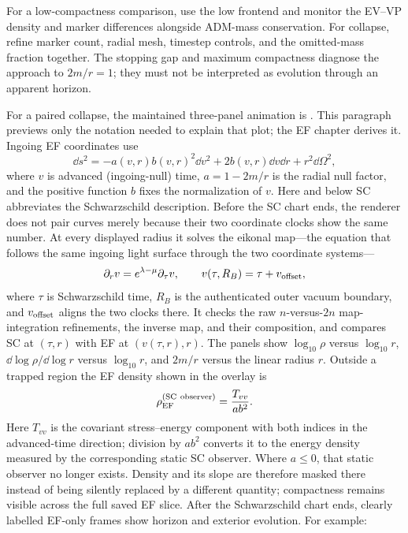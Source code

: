 For a low-compactness comparison, use the low frontend and monitor the EV--VP
density and marker differences alongside ADM-mass conservation.  For collapse,
refine marker count, radial mesh, timestep controls, and the omitted-mass
fraction together.  The stopping gap and maximum compactness diagnose the
approach to \(2m/r=1\); they must not be interpreted as evolution through an
apparent horizon.

For a paired collapse, the maintained three-panel animation is
.  This
paragraph previews only the notation needed to explain that plot; the EF
chapter derives it.  Ingoing EF coordinates use
\[
 \dd s^2=-a(v,r)b(v,r)^2\dd v^2+2b(v,r)\dd v\dd r
          +r^2\dd\Omega^2,
\]
where \(v\) is advanced (ingoing-null) time, \(a=1-2m/r\) is the radial null
factor, and the positive function \(b\) fixes the normalization of \(v\).
Here and below SC abbreviates the Schwarzschild description.
Before the SC chart ends, the renderer does not pair curves merely because
their two coordinate clocks show the same number.  At every displayed radius
it solves the eikonal map---the equation that follows the same ingoing light
surface through the two coordinate systems---
\[
 \partial_r v=e^{\lambda-\mu}\partial_\tau v,
 \qquad v(\tau,R_B)=\tau+v_{\rm offset},
\]
where \(\tau\) is Schwarzschild time, \(R_B\) is the authenticated outer vacuum
boundary, and \(v_{\rm offset}\) aligns the two clocks there.  It checks the
raw \(n\)-versus-\(2n\) map-integration refinements, the inverse map, and their
composition, and compares SC at \((\tau,r)\) with EF at
\((v(\tau,r),r)\).  The panels show
\(\log_{10}\rho\) versus \(\log_{10}r\),
\(\dd\log\rho/\dd\log r\) versus \(\log_{10}r\), and \(2m/r\) versus the
linear radius \(r\).  Outside a trapped region the EF density shown in the
overlay is
\[
 \rho_{\rm EF}^{(\mathrm{SC\ observer})}=\frac{T_{vv}}{a b^2}.
\]
Here \(T_{vv}\) is the covariant stress--energy component with both indices in
the advanced-time direction; division by \(ab^2\) converts it to the energy
density measured by the corresponding static SC observer.
Where \(a\leq0\), that static observer no longer exists.  Density and its
slope are therefore masked there instead of being silently replaced by a
different quantity; compactness remains visible across the full saved EF
slice.  After the Schwarzschild chart ends, clearly labelled EF-only frames
show horizon and exterior evolution.  For example:
